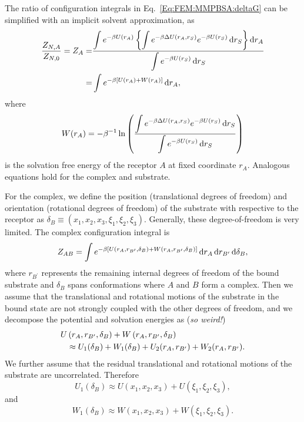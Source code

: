 The ratio of configuration integrals in Eq.~\ref{Eq:FEM:MMPBSA:deltaG} can be simplified with an implicit solvent approximation, as
\begin{align}
	\frac{Z_{N,A}}{Z_{N,0}}=Z_A=&\frac{\displaystyle\int e^{-\beta U(r_A)}\left\{\displaystyle\int e^{-\beta\Delta U(r_A,r_S)}e^{-\beta U(r_S)}\mathop{}\!\mathrm{d} r_S\right\}\mathop{}\!\mathrm{d} r_A}{\displaystyle\int e^{-\beta U(r_S)}\mathop{}\!\mathrm{d} r_S}\notag\\
	                           =&\int e^{-\beta \left[U(r_A)+W(r_A)\right]}\mathop{}\!\mathrm{d} r_A,
\end{align}
where
\begin{equation}
	W(r_A)=-\beta^{-1}\ln{\left(\frac{\displaystyle\int e^{-\beta\Delta U(r_A,r_S)}e^{-\beta U(r_S)}\mathop{}\!\mathrm{d}r_S}{\displaystyle\int e^{-\beta U(r_S)}\mathop{}\!\mathrm{d}r_S}\right)}
\end{equation}
is the solvation free energy of the receptor $A$ at fixed coordinate $r_A$. Analogous equations hold for the complex and substrate.

For the complex, we define the position (translational degrees of freedom) and orientation (rotational degrees of freedom) of the substrate with respective to the receptor as $\delta_B\equiv\left(x_1,x_2,x_3,\xi_1,\xi_2,\xi_3\right)$. Generally, these degree-of-freedom is very limited. The complex configuration integral is 
\begin{equation}
	Z_{AB}=\int e^{-\beta\left[U\left(r_A,r_{B^\prime},\delta_B\right)+W\left(r_A,r_{B^\prime},\delta_B\right)\right]}\mathop{}\!\mathrm{d} r_A\mathop{}\!\mathrm{d} r_{B^\prime}\mathop{}\!\mathrm{d}\delta_B,
\end{equation}
where $r_{B^\prime}$ represents the remaining internal degrees of freedom of the bound substrate and $\delta_B$ spans conformations where $A$ and $B$ form a complex. 
Then we assume that the translational and rotational motions of the substrate in the bound state are not strongly coupled with the other degrees of freedom, and we decompose the potential and solvation energies as (\textit{so weird!})
\begin{align}
	U&\left(r_A,r_{B^\prime},\delta_B\right)+W\left(r_A,r_{B^\prime},\delta_B\right)\notag\\
	 &\approx U_1(\delta_B) + W_1(\delta_B) +U_2(r_A,r_{B^\prime})+W_2(r_A,r_{B^\prime}).
\end{align}
We further assume that the residual translational and rotational motions of the substrate are uncorrelated. Therefore
\begin{equation}
	U_1(\delta_B) \approx U(x_1,x_2,x_3) + U(\xi_1,\xi_2,\xi_3),
\end{equation}
and
\begin{equation}
	W_1(\delta_B) \approx W(x_1,x_2,x_3) + W(\xi_1,\xi_2,\xi_3).
\end{equation}

